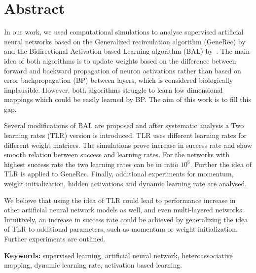 
\section*{Abstract}

In our work, we used computational simulations to analyse supervised artificial neural networks based on the Generalized recirculation algorithm (GeneRec) by~\citet{o1996bio} and the Bidirectional Activation-based Learning algorithm (BAL) by~\citet{farkas2013bal}. The main idea of both algorithms is to update weights based on the difference between forward and backward propagation of neuron activations rather than based on error backpropagation (BP) between layers, which is considered biologically implausible. However, both algorithms struggle to learn low dimensional mappings which could be easily learned by BP. The aim of this work is to fill this gap. 

Several modifications of BAL are proposed and after systematic analysis a Two learning rates (TLR) version is introduced. TLR uses different learning rates for different weight matrices. The simulations prove increase in success rate and show smooth relation between success and learning rates. For the networks with highest success rate the two learning rates can be in ratio $10^6$. Further the idea of TLR is applied to GeneRec. Finally, additional experiments for momentum, weight initialization, hidden activations and dynamic learning rate are analysed. 

We believe that using the idea of TLR could lead to performance increase in other artificial neural network models as well, and even multi-layered networks. Intuitively, an increase in success rate could be achieved by generalizing the idea of TLR to additional parameters, such as momentum or weight initialization. Further experiments are outlined. 

\begin{flushleft}
  \textbf{Keywords:} supervised learning, artificial neural network, heteroassociative mapping, dynamic learning rate, activation based learning. 
\end{flushleft}


